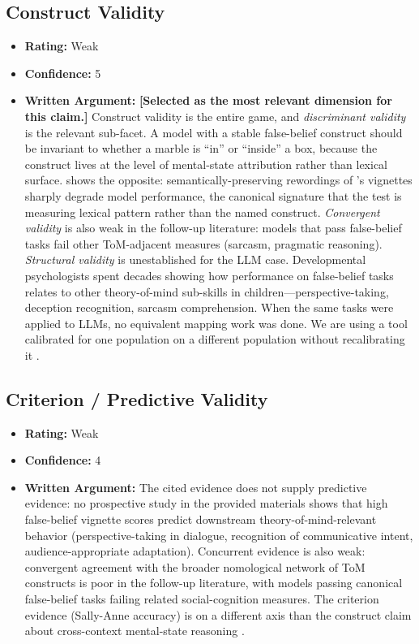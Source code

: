 \subsection{Construct Validity}
\begin{itemize}
    \item \textbf{Rating:} Weak
    \item \textbf{Confidence:} 5
    \item \textbf{Written Argument:} \textbf{[Selected as the most relevant dimension for this claim.]} Construct validity is the entire game, and \emph{discriminant validity} is the relevant sub-facet. A model with a stable false-belief construct should be invariant to whether a marble is ``in'' or ``inside'' a box, because the construct lives at the level of mental-state attribution rather than lexical surface. \citet{ullman2023llm} shows the opposite: semantically-preserving rewordings of \citet{kosinski2024tom}'s vignettes sharply degrade model performance, the canonical signature that the test is measuring lexical pattern rather than the named construct. \emph{Convergent validity} is also weak in the follow-up literature: models that pass false-belief tasks fail other ToM-adjacent measures (sarcasm, pragmatic reasoning). \emph{Structural validity} is unestablished for the LLM case. Developmental psychologists spent decades showing how performance on false-belief tasks relates to other theory-of-mind sub-skills in children---perspective-taking, deception recognition, sarcasm comprehension. When the same tasks were applied to LLMs, no equivalent mapping work was done. We are using a tool calibrated for one population on a different population without recalibrating it \citep{salaudeen2025measurement}.
\end{itemize}

\subsection{Criterion / Predictive Validity}
\begin{itemize}
    \item \textbf{Rating:} Weak
    \item \textbf{Confidence:} 4
    \item \textbf{Written Argument:} The cited evidence does not supply predictive evidence: no prospective study in the provided materials shows that high false-belief vignette scores predict downstream theory-of-mind-relevant behavior (perspective-taking in dialogue, recognition of communicative intent, audience-appropriate adaptation). Concurrent evidence is also weak: convergent agreement with the broader nomological network of ToM constructs is poor in the follow-up literature, with models passing canonical false-belief tasks failing related social-cognition measures. The criterion evidence (Sally-Anne accuracy) is on a different axis than the construct claim about cross-context mental-state reasoning \citep{ullman2023llm,salaudeen2025measurement}.
\end{itemize}

